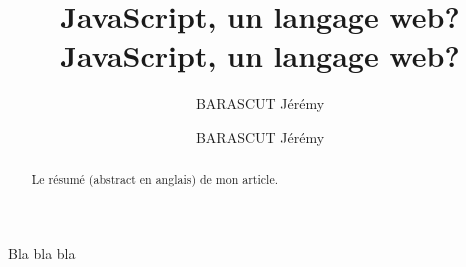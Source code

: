 \documentclass[a4paper,10pt]{report}
\title{JavaScript, un langage web?}
\author{\textsc{BARASCUT} Jérémy}
\date{} %
\title{JavaScript, un langage web?}
\date{}
\author{BARASCUT Jérémy}
\begin{document}
 
\maketitle
 
\begin{abstract}
Le résumé (abstract en anglais) de mon article.
\end{abstract}


 
 
\tableofcontents

% 





















 
Bla bla bla
 
\listoffigures
\listoftables
\printindex
\end{document}
